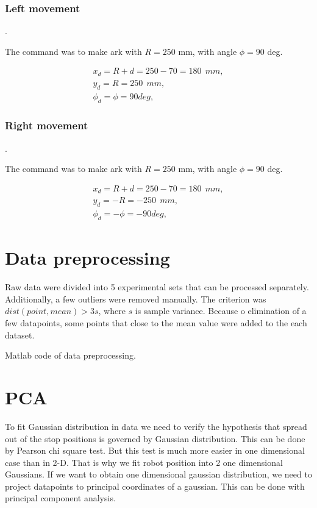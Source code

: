 \documentclass[a4paper, 12pt]{article}
\begin{document}
\subsubsection{Left movement}.

The command was to make ark with $R = 250$ mm, with angle $\phi = 90$ deg.

\medskip

$$
\begin{array}{l}
x_d = R + d = 250-70 = 180 ~~mm, \\
y_d = R = 250 ~~mm, \\
\phi_d = \phi = 90 deg,
\end{array}
$$

\subsubsection{Right movement}.

The command was to make ark with $R = 250$ mm, with angle $\phi = 90$ deg.

\medskip

$$
\begin{array}{l}
x_d = R + d = 250-70 = 180 ~~mm, \\
y_d = -R = -250 ~~mm, \\
\phi_d = -\phi = -90 deg,
\end{array}
$$


\section{Data preprocessing}
Raw data were divided into 5 experimental sets that can be processed separately. Additionally, a few outliers were removed manually. The criterion was $dist(point,mean)>3 s$, where $s$ is sample variance. Because o elimination of a few datapoints, some points that close to the mean value were added to the each dataset.

\medskip

Matlab code of data preprocessing.



\newpage

\section{PCA}
To fit Gaussian distribution in data we need to verify the hypothesis that spread out of the stop positions is governed by Gaussian distribution. This can be done by Pearson chi square test. But this test is much more easier in one dimensional case than in 2-D. That is why we fit robot position into 2 one dimensional Gaussians. If we want to obtain one dimensional gaussian distribution, we need to project datapoints to principal coordinates of a gaussian. This can be done with principal component analysis.
\end{document}
